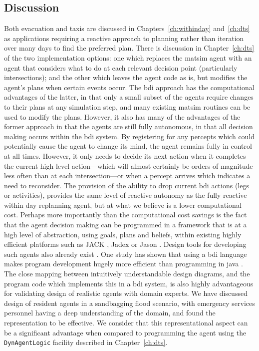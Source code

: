 \subsection{Discussion}
Both evacuation and taxis are discussed in Chapters~\ref{ch:withinday} and~\ref{ch:dts} 
as applications requiring a reactive approach to planning
rather than iteration over many days to find the preferred plan. There
is discussion in Chapter~\ref{ch:dts} of the two implementation options: one
which replaces the \gls{matsim} agent with an agent that considers what to
do at each relevant decision point (particularly intersections); and
the other which leaves the agent code as is, but modifies the agent's
plans when certain events occur. The \gls{bdi} approach has the computational
advantages of the latter, in that only a small subset of the agents
require changes to their plans at any simulation step, and many
existing \gls{matsim} routines can be used to modify the plans. However, it
also has many of the advantages of the former approach in that the
agents are still fully autonomous, in that all decision making occurs
within the \gls{bdi} system. By registering for any percepts which could
potentially cause the agent to change its mind, the agent remains
fully in control at all times. However, it only needs to decide its next action
when it completes the current high level action---which will almost
certainly be orders of magnitude less often than at each intersection---or when 
a percept arrives which indicates a need to reconsider. The
provision of the ability to drop current \gls{bdi} actions (legs or
activities), provides the same level of reactive autonomy as the fully
reactive within day replanning agent, but at what we believe is a
lower computational cost. 
%
Perhaps more importantly than the computational cost savings is the
fact that the agent decision making can be programmed in a framework
that is at a high level of abstraction, using goals, plans and
beliefs, within existing highly efficient platforms such as JACK
\citep{jackref}, Jadex \citep{jadex2005} or Jason \citep{jason}. Design
tools for developing such agents also already exist
\citep{prometheusbook}. One study has shown that using a \gls{bdi} language
makes program development hugely more efficient than programming in
\gls{java} \citep{benfield}. The close mapping between intuitively
understandable design diagrams, and the program code which implements
this in a \gls{bdi} system, is also highly advantageous for validating
design of realistic agents with domain experts. We have discussed
design of resident agents in a sandbagging flood scenario, with
emergency services personnel having a deep understanding of the
domain, and found the representation to be effective. We consider that
this representational aspect can be a significant advantage when
compared to programming the agent using the \lstinline{DynAgentLogic}
facility described in Chapter~\ref{ch:dts}.









